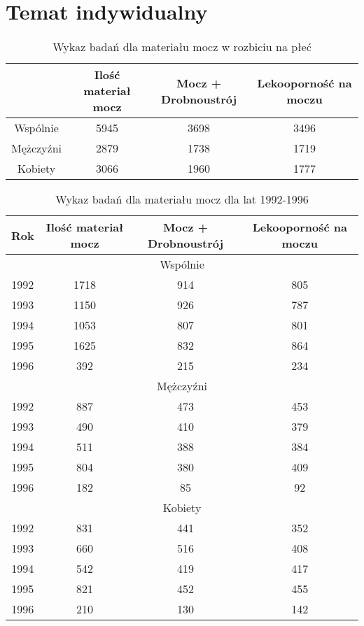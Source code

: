 \documentclass[a4paper,11pt]{article}
\begin{document}
\section{Temat indywidualny}

\begin{table}[h]
  \begin{center}
  \caption{Wykaz badań dla materiału mocz w rozbiciu na płeć}
  \begin{tabular}{|c|c|c|c|}
  \hline
  &Ilość materiał mocz & Mocz + Drobnoustrój & Lekooporność na moczu \\ \hline
  Wspólnie &5945 &3698 &3496\\ \hline
Mężczyźni &2879 &1738 &1719\\ \hline
Kobiety &3066 &1960 &1777\\ \hline
  \end{tabular}
\end{center}
\end{table}

\begin{table}[h]
  \begin{center}
  \caption{Wykaz badań dla materiału mocz dla lat 1992-1996}
  \begin{tabular}{|c|c|c|c|}
  \hline
  Rok & Ilość materiał mocz & Mocz + Drobnoustrój & Lekooporność na moczu \\ \hline 
  
\multicolumn{4}{|c|}{Wspólnie} \\ \hline
1992 &1718 &914 &805\\ \hline
1993 &1150 &926 &787\\ \hline
1994 &1053 &807 &801\\ \hline
1995 &1625 &832 &864\\ \hline
1996 &392 &215 &234\\ \hline



\multicolumn{4}{|c|}{Mężczyźni} \\ \hline
1992 &887 &473 &453\\ \hline
1993 &490 &410 &379\\ \hline
1994 &511 &388 &384\\ \hline
1995 &804 &380 &409\\ \hline
1996 &182 &85 &92\\ \hline



\multicolumn{4}{|c|}{Kobiety} \\ \hline
1992 &831 &441 &352\\ \hline
1993 &660 &516 &408\\ \hline
1994 &542 &419 &417\\ \hline
1995 &821 &452 &455\\ \hline
1996 &210 &130 &142\\ \hline
\end{tabular}
\end{center}
\end{table}
\end{document}
